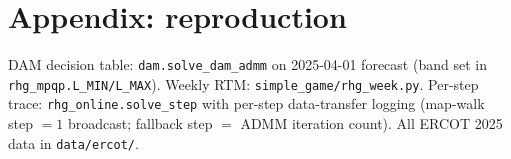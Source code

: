 \documentclass[11pt, letterpaper]{article}
\begin{document}
\section*{Appendix: reproduction}
\small
DAM decision table: \texttt{dam.solve\_dam\_admm} on 2025-04-01 forecast (band set in
\texttt{rhg\_mpqp.L\_MIN/L\_MAX}). Weekly RTM: \texttt{simple\_game/rhg\_week.py}. Per-step trace:
\texttt{rhg\_online.solve\_step} with per-step data-transfer logging (map-walk step $=1$ broadcast;
fallback step $=$ ADMM iteration count). All ERCOT 2025 data in \texttt{data/ercot/}.
\end{document}
